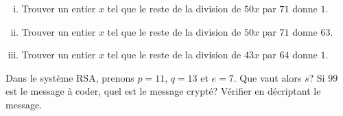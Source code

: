 
\vspace*{0.8cm}
\begin{exo} 
\begin{enumerate}[(i)]
\item Trouver un entier $x$ tel que le reste de la division de $50x$ par $71$ donne $1$.
\item Trouver un entier $x$ tel que le reste de la division de $50x$ par $71$ donne $63$.
\item Trouver un entier $x$ tel que le reste de la division de $43x$ par $64$ donne $1$.
\end{enumerate}
\end{exo}


\vspace*{0.8cm}
\begin{exo}
Dans le syst\`eme RSA, prenons $p=11$, $q=13$ et $e=7$. Que vaut alors $s$? Si $99$ est le message \`a coder, quel est le message crypt\'e? V\'erifier en d\'ecriptant le message.
\end{exo}

\thispagestyle{empty}